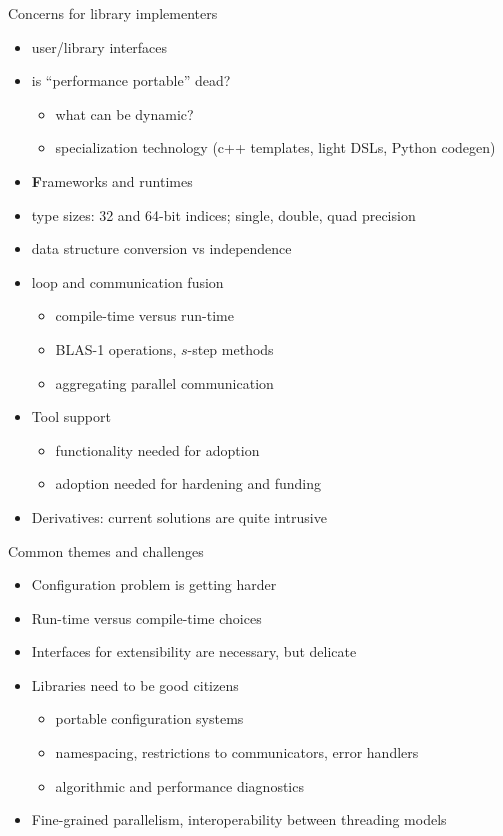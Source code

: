 \documentclass{beamer}
\begin{document}
\begin{frame}{Concerns for library implementers}
  \begin{itemize}
  \item user/library interfaces
  \item is ``performance portable'' dead?
    \begin{itemize}
    \item what can be dynamic?
    \item specialization technology (c++ templates, light DSLs, Python codegen)
    \end{itemize}
  \item {\bf \large F}rameworks and runtimes
  \item type sizes: 32 and 64-bit indices; single, double, quad precision
  \item data structure conversion vs independence
  \item loop and communication fusion
    \begin{itemize}
    \item compile-time versus run-time
    \item BLAS-1 operations, $s$-step methods
    \item aggregating parallel communication
    \end{itemize}
  \item Tool support
    \begin{itemize}
    \item functionality needed for adoption
    \item adoption needed for hardening and funding
    \end{itemize}
  \item Derivatives: current solutions are quite intrusive
  \end{itemize}
\end{frame}

\begin{frame}{Common themes and challenges}
  \begin{itemize}
  \item Configuration problem is getting harder
  \item Run-time versus compile-time choices
  \item Interfaces for extensibility are necessary, but delicate
  \item Libraries need to be good citizens
    \begin{itemize}
    \item portable configuration systems
    \item namespacing, restrictions to communicators, error handlers
    \item algorithmic and performance diagnostics
    \end{itemize}
  \item Fine-grained parallelism, interoperability between threading models
  \end{itemize}
\end{frame}
\end{document}
